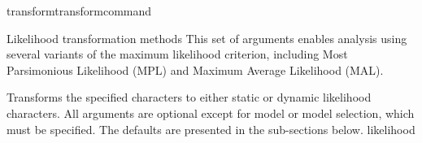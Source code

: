 \begin{command}{transform}{transformcommand}
\begin{arguments}
\begin{argumentgroup}
            
        \end{argumentgroup}
   




        \begin{argumentgroup}{Likelihood transformation methods}
            This set of arguments enables analysis using several variants of the
            maximum likelihood criterion, including Most Parsimonious Likelihood (MPL)
            and Maximum Average Likelihood (MAL). 

                {Transforms the specified characters to either static or dynamic
                likelihood characters. All arguments are optional except for model or model selection, 
                which must  be specified.  The defaults are presented in the sub-sections below.}
                {likelihood}


\end{argumentgroup}
\end{arguments}
\end{command}
